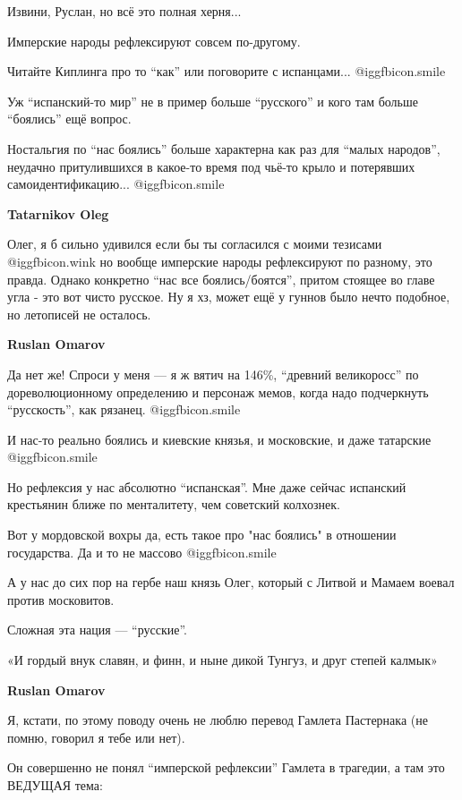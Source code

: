 \begin{itemize}
Извини, Руслан, но всё это полная херня...

Имперские народы рефлексируют совсем по-другому.

Читайте Киплинга про то \enquote{как} или поговорите с испанцами...  @igg{fbicon.smile} 

Уж \enquote{испанский-то мир} не в пример больше \enquote{русского} и кого там
больше \enquote{боялись} ещё вопрос.

Ностальгия по \enquote{нас боялись} больше характерна как раз для
\enquote{малых народов}, неудачно притулившихся в какое-то время под чьё-то
крыло и потерявших самоидентификацию...  @igg{fbicon.smile} 

\begin{itemize} %
\textbf{Tatarnikov Oleg} 

Олег, я б сильно удивился если бы ты согласился с моими тезисами
@igg{fbicon.wink}  но вообще имперские народы рефлексируют по разному, это
правда. Однако конкретно \enquote{нас все боялись/боятся}, притом стоящее во
главе угла - это вот чисто русское. Ну я хз, может ещё у гуннов было нечто
подобное, но летописей не осталось.

\textbf{Ruslan Omarov} 

Да нет же! Спроси у меня — я ж вятич на 146\%, \enquote{древний великоросс} по
дореволюционному определению и персонаж мемов, когда надо подчеркнуть
\enquote{русскость}, как рязанец.  @igg{fbicon.smile} 

И нас-то реально боялись и киевские князья, и московские, и даже татарские  @igg{fbicon.smile} 

Но рефлексия у нас абсолютно \enquote{испанская}. Мне даже сейчас испанский
крестьянин ближе по менталитету, чем советский колхознек.

Вот у мордовской вохры да, есть такое про "нас боялись" в отношении
государства. Да и то не массово  @igg{fbicon.smile} 

А у нас до сих пор на гербе наш князь Олег, который с Литвой и Мамаем воевал
против московитов.

Сложная эта нация — \enquote{русские}.

«И гордый внук славян, и финн, и ныне дикой Тунгуз, и друг степей калмык»

\textbf{Ruslan Omarov} 

Я, кстати, по этому поводу очень не люблю перевод Гамлета Пастернака (не помню,
говорил я тебе или нет).

Он совершенно не понял \enquote{имперской рефлексии} Гамлета в трагедии, а там
это ВЕДУЩАЯ тема:


\end{itemize}
\end{itemize}
